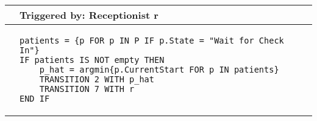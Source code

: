 \begin{tabular}{@{}>{\raggedright\arraybackslash}p{0.25cm}>{\raggedright\arraybackslash}p{13cm}@{}}
  \toprule
   & Triggered by: Receptionist r\\ \midrule 
  &
\vspace{-12pt}
\begin{lstlisting}[language=CMPseudo]
patients = {p FOR p IN P IF p.State = "Wait for Check In"}
IF patients IS NOT empty THEN 
    p_hat = argmin{p.CurrentStart FOR p IN patients}
    TRANSITION 2 WITH p_hat
    TRANSITION 7 WITH r
END IF
  \end{lstlisting}  
  \\ \bottomrule
  \end{tabular}